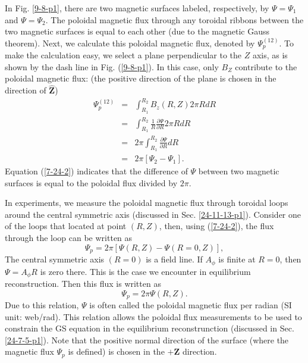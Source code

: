 \documentclass{llncs}
\begin{document}
In Fig. \ref{9-8-p1}, there are two magnetic surfaces labeled, respectively,
by $\Psi = \Psi_1$ and $\Psi = \Psi_2$. The poloidal magnetic flux through any
toroidal ribbons between the two magnetic surfaces is equal to each other (due
to the magnetic Gauss theorem). Next, we calculate this poloidal magnetic
flux, denoted by $\Psi_p^{(12)}$. To make the calculation easy, we select a
plane perpendicular to the $Z$ axis, as is shown by the dash line in Fig.
(\ref{9-8-p1}). In this case, only $B_Z$ contribute to the poloidal magnetic
flux: (the positive direction of the plane is chosen in the direction of
$\hat{\mathbf{Z}}$)
\begin{eqnarray}
  \Psi_p^{(12)} & = & \int_{R_1}^{R_2} B_z (R, Z) 2 \pi R d R \nonumber\\
  & = & \int_{R_1}^{R_2} \frac{1}{R}  \frac{\partial \Psi}{\partial R} 2 \pi
  R d R \nonumber\\
  & = & 2 \pi \int^{R_2}_{R_1} \frac{\partial \Psi}{\partial R} d R
  \nonumber\\
  & = & 2 \pi [\Psi_2 - \Psi_1] .  \label{7-24-2}
\end{eqnarray}
Equation (\ref{7-24-2}) indicates that the difference of $\Psi$ between two
magnetic surfaces is equal to the poloidal flux divided by $2 \pi$.

In experiments, we measure the poloidal magnetic flux through toroidal loops
around the central symmetric axis (discussed in Sec. \ref{24-11-13-p1}).
Consider one of the loops that located at point $(R, Z)$, then, using
(\ref{7-24-2}), the flux through the loop can be written as
\begin{equation}
  \Psi_p = 2 \pi [\Psi (R, Z) - \Psi (R = 0, Z)],
\end{equation}
The central symmetric axis $(R = 0)$ is a field line. If $A_{\phi}$ is finite
at $R = 0$, then $\Psi = A_{\phi} R$ is zero there. This is the case we
encounter in equilibrium reconstruction. Then this flux is written as
\begin{equation}
  \Psi_p = 2 \pi \Psi (R, Z) .
\end{equation}
Due to this relation, $\Psi$ is often called the poloidal magnetic flux per
radian (SI unit: web/rad). This relation allows the poloidal flux measurements
to be used to constrain the GS equation in the equilibrium reconstrunction
(discussed in Sec. \ref{24-7-5-p1}). Note that the positive normal direction
of the surface (where the magnetic flux $\Psi_p$ is defined) is chosen in the
$+\mathbf{Z}$ direction.
\end{document}
